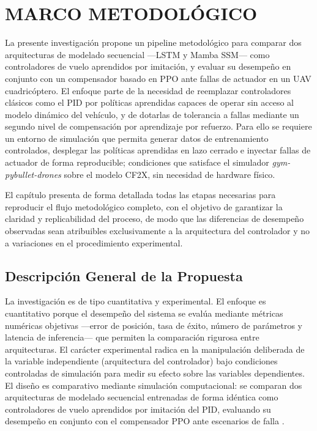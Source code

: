 \chapter{MARCO METODOLÓGICO}

La presente investigación propone un pipeline metodológico para comparar dos arquitecturas de modelado secuencial —LSTM y Mamba SSM— como controladores de vuelo aprendidos por imitación, y evaluar su desempeño en conjunto con un compensador basado en PPO ante fallas de actuador en un UAV cuadricóptero. El enfoque parte de la necesidad de reemplazar controladores clásicos como el PID por políticas aprendidas capaces de operar sin acceso al modelo dinámico del vehículo, y de dotarlas de tolerancia a fallas mediante un segundo nivel de compensación por aprendizaje por refuerzo. Para ello se requiere un entorno de simulación que permita generar datos de entrenamiento controlados, desplegar las políticas aprendidas en lazo cerrado e inyectar fallas de actuador de forma reproducible; condiciones que satisface el simulador \textit{gym-pybullet-drones} sobre el modelo CF2X, sin necesidad de hardware físico.

El capítulo presenta de forma detallada todas las etapas necesarias para reproducir el flujo metodológico completo, con el objetivo de garantizar la claridad y replicabilidad del proceso, de modo que las diferencias de desempeño observadas sean atribuibles exclusivamente a la arquitectura del controlador y no a variaciones en el procedimiento experimental.


\section{Descripción General de la Propuesta}

La investigación es de tipo cuantitativa y experimental. El enfoque es cuantitativo porque el desempeño del sistema se evalúa mediante métricas numéricas objetivas —error de posición, tasa de éxito, número de parámetros y latencia de inferencia— que permiten la comparación rigurosa entre arquitecturas. El carácter experimental radica en la manipulación deliberada de la variable independiente (arquitectura del controlador) bajo condiciones controladas de simulación para medir su efecto sobre las variables dependientes. El diseño es comparativo mediante simulación computacional: se comparan dos arquitecturas de modelado secuencial entrenadas de forma idéntica como controladores de vuelo aprendidos por imitación del PID, evaluando su desempeño en conjunto con el compensador PPO ante escenarios de falla \cite{zhang2023, hsu2024}.

